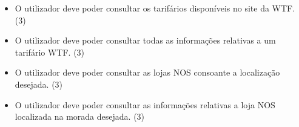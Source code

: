 \documentclass[11pt,a4paper]{article}
\newcommand{\requirement}[3]{
    #1 (#3)
}
\begin{document}
\begin{appendices}
\begin{itemize}
    \item \requirement{O utilizador deve poder consultar os tarifários disponíveis no site da WTF.}{A consulta dos diferentes tarifários WTF permite ao utilizador tomar conhecimento de toda a oferta e fazer uma escolha consciente.}{3}
    \item \requirement{O utilizador deve poder consultar todas as informações relativas a um tarifário WTF.}{A consulta de tarifários específicos permite ao utilizador restringir a sua pesquisa ao produto de interesse.}{3}
    \item \requirement{O utilizador deve poder consultar as lojas NOS consoante a localização desejada.}{Para obter algum tipo de informações, o utilizador pode preferir/necessitar de falar pessoalmente com um colaborador da NOS.}{3}
    \item \requirement{O utilizador deve poder consultar as informações relativas a loja NOS localizada na morada desejada.}{Para obter algum tipo de informações, o utilizador pode preferir/necessitar de falar pessoalmente com um colaborador da NOS.}{3}
\end{itemize}


\end{appendices}
\end{document}
